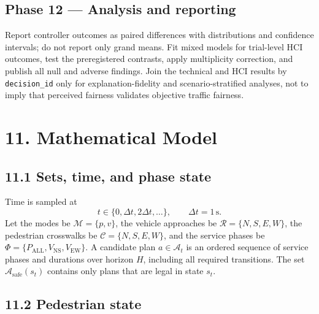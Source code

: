 \documentclass[
  english,
  11pt,
  a4paper,
]{article}
\begin{document}
\subsection{Phase 12 --- Analysis and
reporting}\label{phase-12-analysis-and-reporting}

Report controller outcomes as paired differences with distributions and
confidence intervals; do not report only grand means. Fit mixed models
for trial-level HCI outcomes, test the preregistered contrasts, apply
multiplicity correction, and publish all null and adverse findings. Join
the technical and HCI results by \texttt{decision\_id} only for
explanation-fidelity and scenario-stratified analyses, not to imply that
perceived fairness validates objective traffic fairness.

\section{11. Mathematical Model}\label{mathematical-model}

\subsection{11.1 Sets, time, and phase state}\label{sets-time-and-phase-state}

Time is sampled at
\[
  t \in \{0,\Delta t,2\Delta t,\ldots\}, \qquad \Delta t = 1\,\mathrm{s}.
\]
Let the modes be \(\mathcal{M}=\{p,v\}\), the vehicle approaches be
\(\mathcal{R}=\{N,S,E,W\}\), the pedestrian crosswalks be
\(\mathcal{C}=\{N,S,E,W\}\), and the service phases be
\(\Phi=\{P_{\mathrm{ALL}},V_{\mathrm{NS}},V_{\mathrm{EW}}\}\). A
candidate plan \(a\in\mathcal{A}_t\) is an ordered sequence of service
phases and durations over horizon \(H\), including all required
transitions. The set \(\mathcal{A}_{\mathrm{safe}}(s_t)\) contains only
plans that are legal in state \(s_t\).

\subsection{11.2 Pedestrian state}\label{pedestrian-state}
\end{document}
